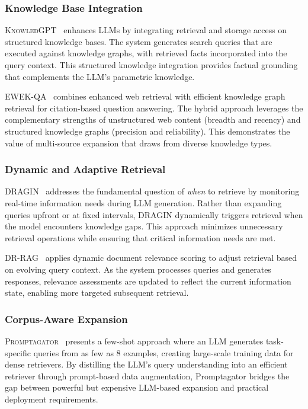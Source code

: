 \documentclass{article}
\begin{document}
\subsubsection{Knowledge Base Integration}

\textsc{KnowledGPT}~\citep{KnowledGPT} enhances LLMs by integrating retrieval and storage access on structured knowledge bases. The system generates search queries that are executed against knowledge graphs, with retrieved facts incorporated into the query context. This structured knowledge integration provides factual grounding that complements the LLM's parametric knowledge.

\textsc{EWEK-QA}~\citep{EWEK-QA} combines enhanced web retrieval with efficient knowledge graph retrieval for citation-based question answering. The hybrid approach leverages the complementary strengths of unstructured web content (breadth and recency) and structured knowledge graphs (precision and reliability). This demonstrates the value of multi-source expansion that draws from diverse knowledge types.

\subsubsection{Dynamic and Adaptive Retrieval}

\textsc{DRAGIN}~\citep{DRAGIN} addresses the fundamental question of \textit{when} to retrieve by monitoring real-time information needs during LLM generation. Rather than expanding queries upfront or at fixed intervals, DRAGIN dynamically triggers retrieval when the model encounters knowledge gaps. This approach minimizes unnecessary retrieval operations while ensuring that critical information needs are met.

\textsc{DR-RAG}~\citep{DR-RAG} applies dynamic document relevance scoring to adjust retrieval based on evolving query context. As the system processes queries and generates responses, relevance assessments are updated to reflect the current information state, enabling more targeted subsequent retrieval.

\subsubsection{Corpus-Aware Expansion}

\textsc{Promptagator}~\citep{Promptagator} presents a few-shot approach where an LLM generates task-specific queries from as few as 8 examples, creating large-scale training data for dense retrievers. By distilling the LLM's query understanding into an efficient retriever through prompt-based data augmentation, Promptagator bridges the gap between powerful but expensive LLM-based expansion and practical deployment requirements.
\end{document}
